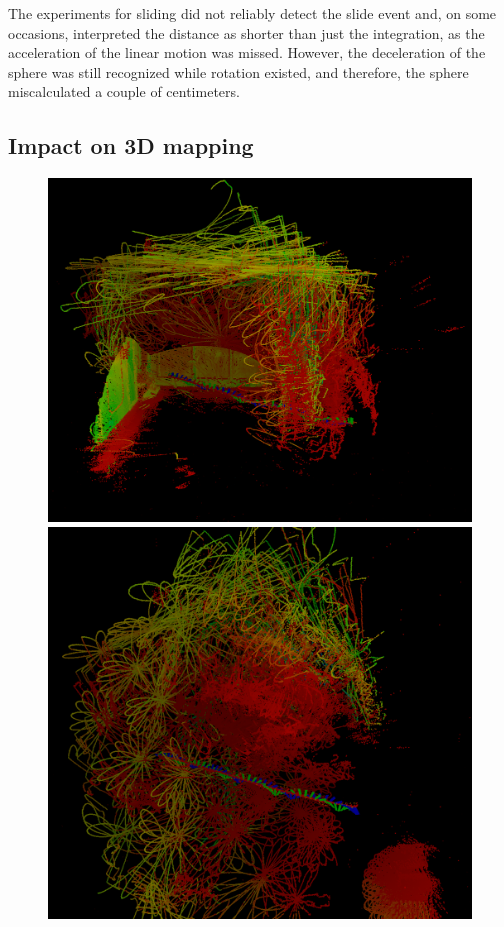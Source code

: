 \documentclass[letterpaper, 10 pt, conference]{ieeeconf}  %
\begin{document}
The experiments for sliding did not reliably detect the slide event and, on some occasions, interpreted the distance as shorter than just the integration, as the acceleration of the linear motion was missed.
However, the deceleration of the sphere was still recognized while rotation existed, and therefore, the sphere miscalculated a couple of centimeters.


\subsection{Impact on 3D mapping}

\begin{figure}
\begin{center}
\includegraphics[width=\linewidth]{./graphics/jasperhome1.png} \\
\vspace{0.2cm}
\includegraphics[width=\linewidth]{./graphics/jasperhome1madw.png}

\end{center}
\end{figure}
\end{document}
